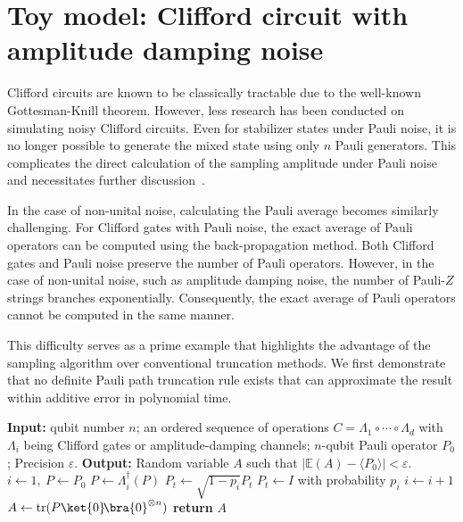 \documentclass[aps,%
twocolumn,%
floatfix,%
pra,%
amsfonts,%
longbibliography,%
groupedaddress,%
superscriptaddress]{revtex4-2}%
\newcommand{\1}{\mathbbm{1}}
\begin{document}
\section{Toy model: Clifford circuit with amplitude damping noise}
Clifford circuits are known to be classically tractable due to the well-known Gottesman-Knill theorem. However, less research has been conducted on simulating noisy Clifford circuits. Even for stabilizer states under Pauli noise, it is no longer possible to generate the mixed state using only $n$ Pauli generators. This complicates the direct calculation of the sampling amplitude under Pauli noise and necessitates further discussion~\cite{mor2023noisy}. 

In the case of non-unital noise, calculating the Pauli average becomes similarly challenging. For Clifford gates with Pauli noise, the exact average of Pauli operators can be computed using the back-propagation method. Both Clifford gates and Pauli noise preserve the number of Pauli operators. However, in the case of non-unital noise, such as amplitude damping noise, the number of Pauli-$Z$ strings branches exponentially. Consequently, the exact average of Pauli operators cannot be computed in the same manner. 

This difficulty serves as a prime example that highlights the advantage of the sampling algorithm over conventional truncation methods. We first demonstrate that no definite Pauli path truncation rule exists that can approximate the result within additive error in polynomial time.

\begin{algorithm}
\caption{Sampling algorithm for simulation of Clifford circuit with amplitude damping noise}
\label{alg:Apd_sampling}
\begin{algorithmic}[1]
\State \textbf{Input:} qubit number $n$; an ordered sequence of operations $C = \Lambda_1 \circ \cdots \circ \Lambda_{d}$ with $\Lambda_i$ being Clifford gates or amplitude-damping channels; $n$-qubit Pauli operator $P_0$; Precision $\varepsilon$.
\State \textbf{Output:} Random variable $A$ such that $|\mathbb{E}(A)- \langle P_0 \rangle| < \varepsilon$.
\State $i \gets 1,~ P \gets P_0$
        \State $P \gets \Lambda_i^\dagger(P)$
                \State $P_t \gets \sqrt{1 - p_i} P_t$
                \State $P_t \gets I$ with probability $p_i$
            \EndIf
        \EndFor
    \EndIf
    \State $i \gets i + 1$
\EndWhile
\State $A \gets \text{tr}(P \ket{0}\!\bra{0}^{\otimes n})$
\State \textbf{return} $A$
\end{algorithmic}
\end{algorithm}
\end{document}
